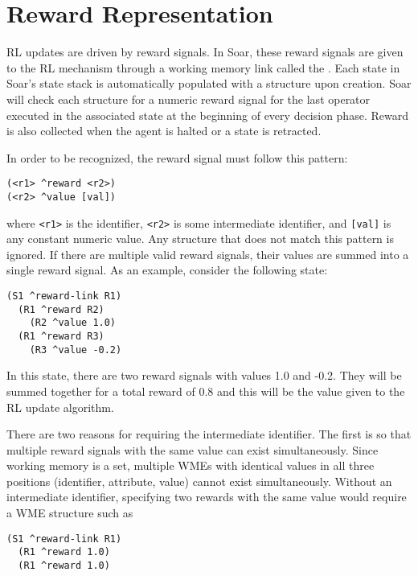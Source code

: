 \section{Reward Representation}
\label{RL-reward}

RL updates are driven by reward signals.
In Soar, these reward signals are given to the RL mechanism through a working memory link called the .
Each state in Soar's state stack is automatically populated with a  structure upon creation.
Soar will check each structure for a numeric reward signal for the last operator executed in the associated state at the beginning of every decision phase.
Reward is also collected when the agent is halted or a state is retracted.

In order to be recognized, the reward signal must follow this pattern:

\begin{verbatim}
(<r1> ^reward <r2>)
(<r2> ^value [val])
\end{verbatim}

where \verb=<r1>= is the  identifier, \verb=<r2>= is some intermediate identifier, and \verb=[val]= is any constant numeric value.
Any structure that does not match this pattern is ignored.
If there are multiple valid reward signals, their values are summed into a single reward signal.
As an example, consider the following state:

\begin{verbatim}
(S1 ^reward-link R1)
  (R1 ^reward R2)
    (R2 ^value 1.0)
  (R1 ^reward R3)
    (R3 ^value -0.2)
\end{verbatim}  

In this state, there are two reward signals with values 1.0 and -0.2.
They will be summed together for a total reward of 0.8 and this will be the value given to the RL update algorithm.

There are two reasons for requiring the intermediate identifier.
The first is so that multiple reward signals with the same value can exist simultaneously.
Since working memory is a set, multiple WMEs with identical values in all three positions (identifier, attribute, value) cannot exist simultaneously.
Without an intermediate identifier, specifying two rewards with the same value would require a WME structure such as

\begin{verbatim}
(S1 ^reward-link R1)
  (R1 ^reward 1.0)
  (R1 ^reward 1.0)
\end{verbatim}

